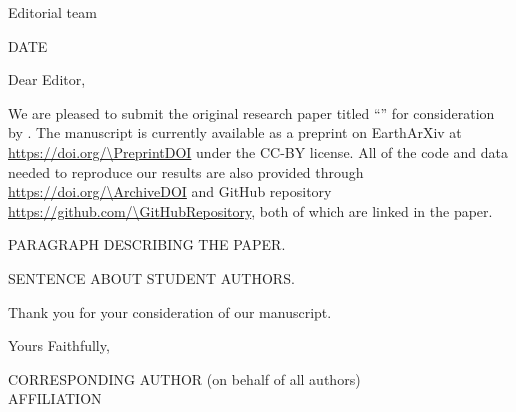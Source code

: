 \documentclass[a4paper,onecolumn,10pt]{article}
\newcommand{\Padding}{\vspace{0.75cm}}
\begin{document}
\begin{flushleft}
    Editorial team
    \\
    \Journal
\end{flushleft}
\begin{flushright}
    DATE
\end{flushright}
\Padding

\noindent
Dear Editor,
\Padding

We are pleased to submit the original research paper titled ``\Title{}'' for
consideration by \Journal{}.
The manuscript is currently available as a preprint on EarthArXiv at
\url{https://doi.org/\PreprintDOI} under the CC-BY license.
All of the code and data needed to reproduce our results are also provided
through \url{https://doi.org/\ArchiveDOI} and GitHub repository
\url{https://github.com/\GitHubRepository}, both of which are linked in the
paper.

PARAGRAPH DESCRIBING THE PAPER.

SENTENCE ABOUT STUDENT AUTHORS.
\Padding

Thank you for your consideration of our manuscript.
\Padding

\begin{flushleft}
  Yours Faithfully,
  \Padding

  CORRESPONDING AUTHOR (on behalf of all authors)
  \\[0.25cm]
  {
    \color{mediumgray}
    \small
    AFFILIATION
  }
\end{flushleft}
\end{document}
